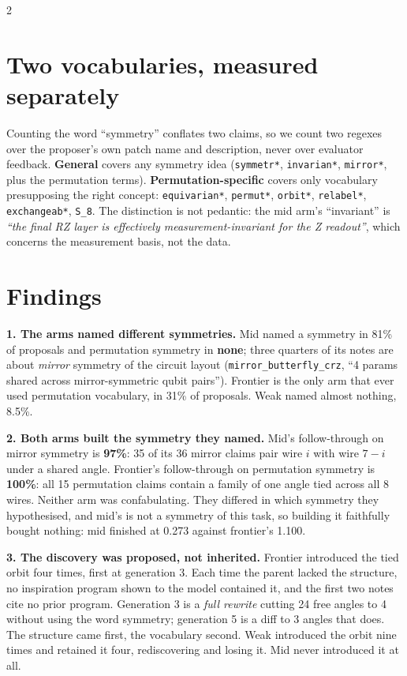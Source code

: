 \documentclass[10pt]{article}
\begin{document}
\begin{multicols}{2}
\section*{Two vocabularies, measured separately}

Counting the word ``symmetry'' conflates two claims, so we count two regexes over
the proposer's own patch name and description, never over evaluator feedback.
\textbf{General} covers any symmetry idea (\texttt{symmetr*}, \texttt{invarian*},
\texttt{mirror*}, plus the permutation terms). \textbf{Permutation-specific} covers
only vocabulary presupposing the right concept: \texttt{equivarian*},
\texttt{permut*}, \texttt{orbit*}, \texttt{relabel*}, \texttt{exchangeab*},
\texttt{S\_8}. The distinction is not pedantic: the mid arm's ``invariant'' is
\emph{``the final RZ layer is effectively measurement-invariant for the Z readout''},
which concerns the measurement basis, not the data.

\columnbreak

\section*{Findings}

\textbf{1. The arms named different symmetries.} Mid named a symmetry in 81\% of
proposals and permutation symmetry in \textbf{none}; three quarters of its notes
are about \emph{mirror} symmetry of the circuit layout (\texttt{mirror\_butterfly\_crz},
``4 params shared across mirror-symmetric qubit pairs''). Frontier is the only arm
that ever used permutation vocabulary, in 31\% of proposals. Weak named almost
nothing, 8.5\%.

\textbf{2. Both arms built the symmetry they named.} Mid's follow-through on
mirror symmetry is \textbf{97\%}: 35 of its 36 mirror claims pair wire $i$ with
wire $7-i$ under a shared angle. Frontier's follow-through on permutation
symmetry is \textbf{100\%}: all 15 permutation claims contain a family of one
angle tied across all 8 wires. Neither arm was confabulating. They differed in
which symmetry they hypothesised, and mid's is not a symmetry of this task, so
building it faithfully bought nothing: mid finished at 0.273 against frontier's
1.100.

\textbf{3. The discovery was proposed, not inherited.} Frontier introduced the tied
orbit four times, first at generation 3. Each time the parent lacked the structure,
no inspiration program shown to the model contained it, and the first two notes cite
no prior program. Generation 3 is a \emph{full rewrite} cutting 24 free angles to 4
without using the word symmetry; generation 5 is a diff to 3 angles that does. The
structure came first, the vocabulary second. Weak introduced the orbit nine times and
retained it four, rediscovering and losing it. Mid never introduced it at all.


\end{multicols}
\end{document}
